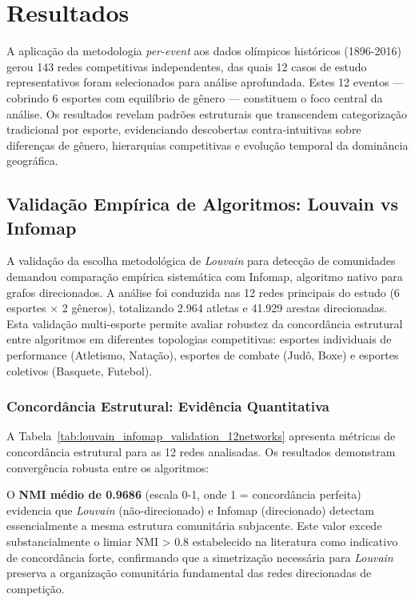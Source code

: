 \chapter{Resultados}
\label{cap:resultados}

A aplicação da metodologia \textit{per-event} aos dados olímpicos históricos (1896-2016) gerou 143 redes competitivas independentes, das quais 12 casos de estudo representativos foram selecionados para análise aprofundada. Estes 12 eventos — cobrindo 6 esportes com equilíbrio de gênero — constituem o foco central da análise. Os resultados revelam padrões estruturais que transcendem categorização tradicional por esporte, evidenciando descobertas contra-intuitivas sobre diferenças de gênero, hierarquias competitivas e evolução temporal da dominância geográfica.

\section{Validação Empírica de Algoritmos: Louvain vs Infomap}
\label{sec:resultados_validacao_louvain}

A validação da escolha metodológica de \textit{Louvain} para detecção de comunidades demandou comparação empírica sistemática com Infomap, algoritmo nativo para grafos direcionados. A análise foi conduzida nas 12 redes principais do estudo (6 esportes × 2 gêneros), totalizando 2.964 atletas e 41.929 arestas direcionadas. Esta validação multi-esporte permite avaliar robustez da concordância estrutural entre algoritmos em diferentes topologias competitivas: esportes individuais de performance (Atletismo, Natação), esportes de combate (Judô, Boxe) e esportes coletivos (Basquete, Futebol).

\subsection{Concordância Estrutural: Evidência Quantitativa}

A Tabela~\ref{tab:louvain_infomap_validation_12networks} apresenta métricas de concordância estrutural para as 12 redes analisadas. Os resultados demonstram convergência robusta entre os algoritmos:



O \textbf{NMI médio de 0.9686} (escala 0-1, onde 1 = concordância perfeita) evidencia que \textit{Louvain} (não-direcionado) e Infomap (direcionado) detectam essencialmente a mesma estrutura comunitária subjacente. Este valor excede substancialmente o limiar NMI > 0.8 estabelecido na literatura \cite{Vinh2010NMI} como indicativo de concordância forte, confirmando que a simetrização necessária para \textit{Louvain} preserva a organização comunitária fundamental das redes direcionadas de competição.


